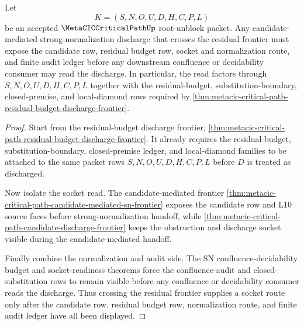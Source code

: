 \begin{theorem}
\label{thm:metacic-critical-path-residual-budget-socket-route}
Let
$$
K=(S,N,O,U,D,H,C,P,L)
$$
be an accepted $\MetaCICCriticalPathUp$ root-unblock packet. Any candidate-mediated strong-normalization discharge that crosses the residual frontier must expose the candidate row, residual budget row, socket and normalization route, and finite audit ledger before any downstream confluence or decidability consumer may read the discharge. In particular, the read factors through $S,N,O,U,D,H,C,P,L$ together with the residual-budget, substitution-boundary, closed-premise, and local-diamond rows required by \autoref{thm:metacic-critical-path-residual-budget-discharge-frontier}.
\end{theorem}
\begin{proof}
Start from the residual-budget discharge frontier, \autoref{thm:metacic-critical-path-residual-budget-discharge-frontier}. It already requires the residual-budget, substitution-boundary, closed-premise ledger, and local-diamond families to be attached to the same packet rows $S,N,O,U,D,H,C,P,L$ before $D$ is treated as discharged.

Now isolate the socket read. The candidate-mediated frontier \autoref{thm:metacic-critical-path-candidate-mediated-sn-frontier} exposes the candidate row and L10 source faces before strong-normalization handoff, while \autoref{thm:metacic-critical-path-candidate-discharge-frontier} keeps the obstruction and discharge socket visible during the candidate-mediated handoff.

Finally combine the normalization and audit side. The SN confluence-decidability budget and socket-readiness theorems force the confluence-audit and closed-substitution rows to remain visible before any confluence or decidability consumer reads the discharge. Thus crossing the residual frontier supplies a socket route only after the candidate row, residual budget row, normalization route, and finite audit ledger have all been displayed.
\end{proof}
